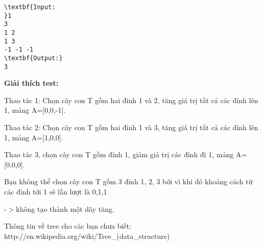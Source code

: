 \begin{verbatim}
\textbf{Input:
}1
3
1 2
1 3
-1 -1 -1
\textbf{Output:}
3
\end{verbatim}

\textbf{Giải thích test:}

Thao tác 1: Chọn cây con T gồm hai đỉnh 1 và 2, tăng giá trị tất cả các đỉnh lên 1, mảng A=[0,0,-1].

Thao tác 2: Chọn cây con T gồm hai đỉnh 1 và 3, tăng giá trị tất cả các đỉnh lên 1, mảng A=[1,0,0].

Thao tác 3, chọn cây con T gồm đỉnh 1, giảm giá trị các đỉnh đi 1, mảng A=[0,0,0].

Bạn không thể chọn cây con T gồm 3 đỉnh 1, 2, 3 bởi vì khi đó khoảng cách từ các đỉnh tới 1 sẽ lần lượt là 0,1,1

-$>$không tạo thành một dãy tăng.

Thông tin về tree cho các bạn chưa biết: http://en.wikipedia.org/wiki/Tree\_(data\_structure)